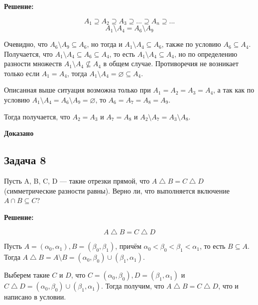 \documentclass[a4paper,14pt]{article} %
\begin{document}
\begin{center}
\bfseries
{\Large Решение: }
\end{center}


\[A_1\supseteq A_2 \supseteq A_3 \supseteq ... \supseteq A_n \supseteq ...\]
\[A_1 \setminus A_4 = A_6 \setminus A_9\]

Очевидно, что $A_6 \setminus A_9 \subseteq A_6$, но тогда и $A_1 \setminus A_4 \subseteq A_6$, также по условию $A_6 \subseteq A_4$. Получается, что $A_1 \setminus A_4 \subseteq A_6 \subseteq A_4$, то есть $A_1 \setminus A_4  \subseteq A_4$, но по определению разности множеств $A_1 \setminus A_4  \nsubseteq A_4$ в общем случае. Противоречия не возникает только если $A_1 = A_4$, тогда $A_1 \setminus A_4 = \varnothing \subseteq A_4$.

Описанная выше ситуация возможна только при $A_1 = A_2 = A_3 =  A_4$, а так как по условию $A_1 \setminus A_4 = A_6 \setminus A_9 = \varnothing$, то $A_6 = A_7 = A_8 = A_9$.

Тогда получается, что $A_2 = A_3$ и $A_7 = A_8$ и $A_2 \setminus A_7 = A_3 \setminus A_8$. \\


\begin{flushright}
\begin{large}
\textbf {Доказано}
\end{large}
\end{flushright}


\newpage
\begin{center}
\subsection{Задача 8}
\end{center}

Пусть A, B, C, D — такие отрезки прямой, что $A \bigtriangleup B = C \bigtriangleup D$ (симметрические разности равны). Верно ли, что выполняется включение $A \cap B \subseteq C$?
\newpage
\begin{center}
\bfseries
{\Large Решение: }
\end{center}


\[A\bigtriangleup B = C\bigtriangleup D\]

Пусть $A = (\alpha_0, \alpha_1),B = (\beta_0, \beta_1) $, причём $\alpha_0 < \beta_0 < \beta_1 < \alpha_1 $, то есть $B\subseteq A$. Тогда $A \bigtriangleup B = A \setminus B = (\alpha_0, \beta_0)\cup (\beta_1, \alpha_1)$.

Выберем такие $C$ и $D$, что $C =(\alpha_0, \beta_0), D = (\beta_1, \alpha_1)$ и $C \bigtriangleup D =(\alpha_0, \beta_0)\cup (\beta_1, \alpha_1) $. Тогда получим, что $A \bigtriangleup B = C \bigtriangleup D$, что и написано в условии.
\end{document}
